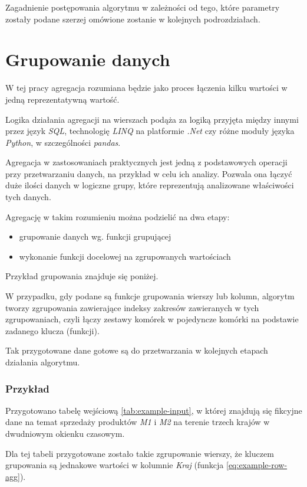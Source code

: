 \documentclass[brudnopis]{xmgr}
\begin{document}
Zagadnienie postępowania algorytmu w zależności od tego, które parametry zostały podane szerzej omówione zostanie w kolejnych podrozdziałach.

\section{Grupowanie danych}

W tej pracy agregacja rozumiana będzie jako proces łączenia kilku wartości w jedną reprezentatywną wartość.
\medskip

Logika działania agregacji na wierszach podąża za logiką przyjęta między innymi przez język \emph{SQL}, technologię \emph{LINQ} \cite{linq} na platformie \emph{.Net} czy różne moduły języka \emph{Python}, w szczególności \emph{pandas}.
\medskip

Agregacja w zastosowaniach praktycznych jest jedną z podstawowych operacji przy przetwarzaniu danych, na przykład w celu ich analizy.
Pozwala ona łączyć duże ilości danych w logiczne grupy, które reprezentują analizowane właściwości tych danych.
\medskip

Agregację w takim rozumieniu można podzielić na dwa etapy:
\begin{itemize}
    \item grupowanie danych wg. funkcji grupującej
    \item wykonanie funkcji docelowej na zgrupowanych wartościach
\end{itemize}
\medskip

Przykład grupowania znajduje się poniżej.
\medskip

W przypadku, gdy podane są funkcje grupowania wierszy lub kolumn, algorytm tworzy zgrupowania zawierające indeksy zakresów zawieranych w tych zgrupowaniach, czyli łączy zestawy komórek w pojedyncze komórki na podstawie zadanego klucza (funkcji).
\medskip

Tak przygotowane dane gotowe są do przetwarzania w kolejnych etapach działania algorytmu.

\subsubsection{Przykład}
\medskip

Przygotowano tabelę wejściową \ref{tab:example-input}, w której znajdują się fikcyjne dane na temat sprzedaży produktów \emph{M1} i \emph{M2} na terenie trzech krajów w dwudniowym okienku czasowym.
\medskip

Dla tej tabeli przygotowane zostało takie zgrupowanie wierszy, że kluczem grupowania są jednakowe wartości w kolumnie \emph{Kraj} (funkcja \ref{eq:example-row-agg}).
\medskip
\end{document}
